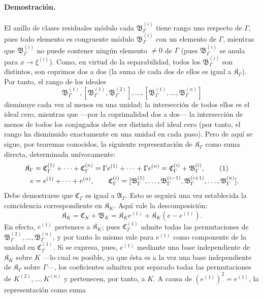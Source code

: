 \paragraph{Demostración.}
El anillo de clases residuales módulo cada $\mathfrak B_\Gamma^{(i)}$ tiene rango uno respecto de $\Gamma$, pues todo elemento es congruente módulo $\mathfrak B_\Gamma^{(i)}$ con un elemento de $\Gamma$, mientras que $\mathfrak B_\Gamma^{(i)}$ no puede contener ningún elemento $\ne0$ de $\Gamma$ (pues $\mathfrak B_\Gamma^{(i)}$ se anula para $x\to\xi^{(i)}$). Como, en virtud de la separabilidad, todos los $\mathfrak B_\Gamma^{(i)}$ son distintos, son coprimos dos a dos (la suma de cada dos de ellos es igual a $\mathfrak K_\Gamma$). Por tanto, el rango de los ideales
\[
\mathfrak B_\Gamma^{(1)},
[\mathfrak B_\Gamma^{(1)},\mathfrak B_\Gamma^{(2)}],\ldots,
[\mathfrak B_\Gamma^{(1)},\ldots,\mathfrak B_\Gamma^{(n)}]
\]
disminuye cada vez al menos en una unidad; la intersección de todos ellos es el ideal cero, mientras que ---por la coprimalidad dos a dos--- la intersección de menos de todos los conjugados debe ser distinta del ideal cero (por tanto, el rango ha disminuido exactamente en una unidad en cada paso). Pero de aquí se sigue, por teoremas conocidos, la siguiente representación de $\mathfrak K_\Gamma$ como suma directa, determinada unívocamente:
\begin{align}
\mathfrak K_\Gamma
&=\mathfrak C_\Gamma^{(1)}+\cdots+\mathfrak C_\Gamma^{(n)}
=\Gamma e^{(1)}+\cdots+\Gamma e^{(n)}
=\mathfrak C_\Gamma^{(i)}+\mathfrak B_\Gamma^{(i)}, \tag{1}\\
e&=e^{(1)}+\cdots+e^{(n)},\qquad
\mathfrak C_\Gamma^{(i)}=
[\mathfrak B_\Gamma^{(1)},\ldots,\mathfrak B_\Gamma^{(i-1)},
\mathfrak B_\Gamma^{(i+1)},\ldots,\mathfrak B_\Gamma^{(n)}].\notag
\end{align}
Debe demostrarse que $\mathfrak C_\Gamma$ es igual a $\mathfrak A_\Gamma$. Esto se seguirá una vez establecida la coincidencia correspondiente en $\mathfrak K_K$. Aquí vale la descomposición:
\begin{equation}
\mathfrak K_K=\mathfrak C_K+\mathfrak B_K
=\mathfrak K_K e^{(1)}+\mathfrak K_K(e-e^{(1)}). \tag{2}
\end{equation}
En efecto, $e^{(1)}$ pertenece a $\mathfrak K_K$; pues $\mathfrak C_\Gamma^{(1)}$ admite todas las permutaciones de $\mathfrak B_\Gamma^{(2)},\ldots,\mathfrak B_\Gamma^{(n)}$, y por tanto lo mismo vale para $e^{(1)}$ como componente de la unidad en $\mathfrak C_\Gamma^{(1)}$. Si se expresa, pues, $e^{(1)}$ mediante una base independiente de $\mathfrak K_K$ sobre $K$ ---lo cual es posible, ya que ésta es a la vez una base independiente de $\mathfrak K_\Gamma$ sobre $\Gamma$---, los coeficientes admiten por separado todas las permutaciones de $K^{(2)},\ldots,K^{(n)}$ y pertenecen, por tanto, a $K$. A causa de $(e^{(1)})^2=e^{(1)}$, la representación como suma
